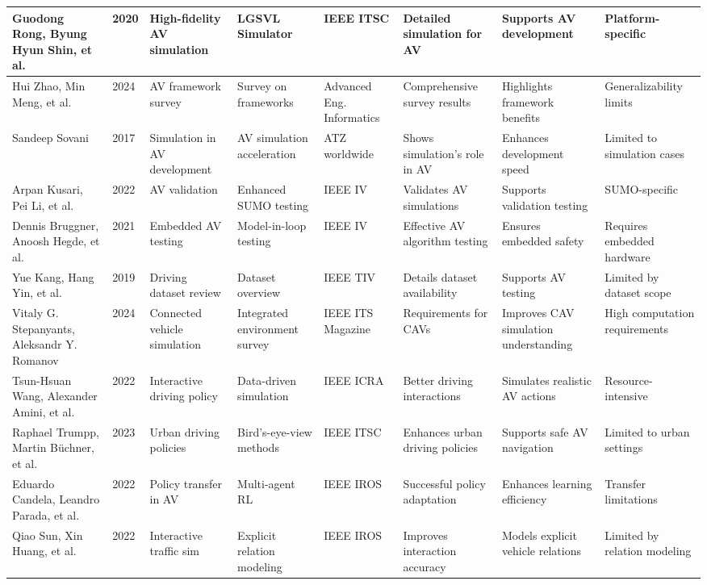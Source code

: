 \documentclass[lettersize,journal]{IEEEtran}
\begin{document}
\begin{longtable}{|p{2cm}|p{1cm}|p{2cm}|p{2cm}|p{2cm}|p{2cm}|p{2cm}|p{2.5cm}|}
\hline
Guodong Rong, Byung Hyun Shin, et al. & 2020 & High-fidelity AV simulation & LGSVL Simulator & IEEE ITSC & Detailed simulation for AV & Supports AV development & Platform-specific \\
\hline
Hui Zhao, Min Meng, et al. & 2024 & AV framework survey & Survey on frameworks & Advanced Eng. Informatics & Comprehensive survey results & Highlights framework benefits & Generalizability limits \\
\hline
Sandeep Sovani & 2017 & Simulation in AV development & AV simulation acceleration & ATZ worldwide & Shows simulation's role in AV & Enhances development speed & Limited to simulation cases \\
\hline
Arpan Kusari, Pei Li, et al. & 2022 & AV validation & Enhanced SUMO testing & IEEE IV & Validates AV simulations & Supports validation testing & SUMO-specific \\
\hline
Dennis Bruggner, Anoosh Hegde, et al. & 2021 & Embedded AV testing & Model-in-loop testing & IEEE IV & Effective AV algorithm testing & Ensures embedded safety & Requires embedded hardware \\
\hline
Yue Kang, Hang Yin, et al. & 2019 & Driving dataset review & Dataset overview & IEEE TIV & Details dataset availability & Supports AV testing & Limited by dataset scope \\
\hline
Vitaly G. Stepanyants, Aleksandr Y. Romanov & 2024 & Connected vehicle simulation & Integrated environment survey & IEEE ITS Magazine & Requirements for CAVs & Improves CAV simulation understanding & High computation requirements \\
\hline
Tsun-Hsuan Wang, Alexander Amini, et al. & 2022 & Interactive driving policy & Data-driven simulation & IEEE ICRA & Better driving interactions & Simulates realistic AV actions & Resource-intensive \\
\hline
Raphael Trumpp, Martin Büchner, et al. & 2023 & Urban driving policies & Bird's-eye-view methods & IEEE ITSC & Enhances urban driving policies & Supports safe AV navigation & Limited to urban settings \\
\hline
Eduardo Candela, Leandro Parada, et al. & 2022 & Policy transfer in AV & Multi-agent RL & IEEE IROS & Successful policy adaptation & Enhances learning efficiency & Transfer limitations \\
\hline
Qiao Sun, Xin Huang, et al. & 2022 & Interactive traffic sim & Explicit relation modeling & IEEE IROS & Improves interaction accuracy & Models explicit vehicle relations & Limited by relation modeling \\

\end{longtable}
\end{document}
